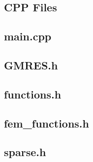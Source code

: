 \documentclass{article}
\begin{document}







\newpage

\begin{appendices}

\section{CPP Files}

\subsection{main.cpp}

\label{code:main}


\subsection{GMRES.h}

\label{code:GMRES}


\subsection{functions.h}

\label{code:functions}

\subsection{fem\_functions.h}

\label{code:femfunctions}


\subsection{sparse.h}

\label{code:sparse}


\end{appendices}
\end{document}
